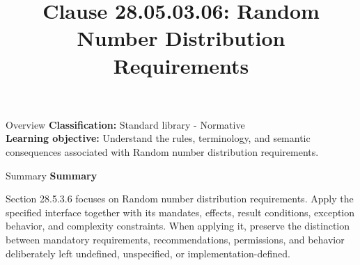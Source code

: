 \documentclass[10pt,letterpaper]{article}
\title{Clause 28.05.03.06: Random Number Distribution Requirements}
\author{}
\date{}
\begin{document}
\maketitle
\begin{CornellOverviewBox}{Overview}
\textbf{Classification:} Standard library - Normative\\[2pt]
\textbf{Learning objective:} Understand the rules, terminology, and semantic consequences associated with Random number distribution requirements.
\end{CornellOverviewBox}\begin{CornellSummaryBox}{Summary}
{\sffamily\bfseries\color{Accent} Summary}\par\vspace{3pt}Section 28.5.3.6 focuses on Random number distribution requirements. Apply the specified interface together with its mandates, effects, result conditions, exception behavior, and complexity constraints. When applying it, preserve the distinction between mandatory requirements, recommendations, permissions, and behavior deliberately left undefined, unspecified, or implementation-defined.
\end{CornellSummaryBox}
\end{document}
